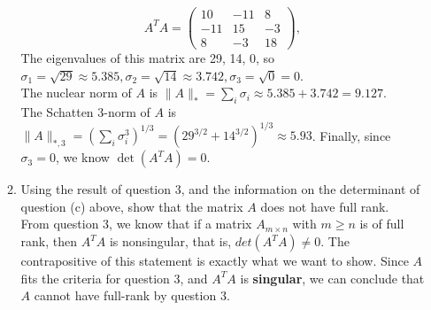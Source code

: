\documentclass[11pt]{article}
\newcommand{\n}{\vspace{0.2cm}}
\begin{document}
\begin{enumerate}
\begin{enumerate}[label=(\alph*)]
\[			            A^TA = \begin{pmatrix} 10 & -11 & 8 \\ -11 & 15 & -3 \\ 8 & -3 & 18 \end{pmatrix},
		            \]
		            The eigenvalues of this matrix are 29, 14, 0, so \(\sigma_1 = \sqrt{29} \approx 5.385, \sigma_2 = \sqrt{14} \approx 3.742, \sigma_3 = \sqrt{0} = 0\). \n\\
		            The nuclear norm of \(A\) is \(\lVert A \rVert_* = \sum_i \sigma_i \approx 5.385 + 3.742 = 9.127\). \n\\
		            The Schatten 3-norm of \(A\) is \(\lVert A \rVert_{*,3} = \left( \sum_i \sigma_i^3 \right)^{1/3} = \left( 29^{3/2} + 14^{3/2} \right)^{1/3} \approx 5.93\).  Finally, since \(\sigma_3 = 0\), we know \(\det(A^TA) = 0\).
		      \item Using the result of question 3, and the information on the determinant of question (c) above, show that the matrix \(A\) does not have full rank. \n\\
		            From question 3, we know that if a matrix \(A_{m \times n}\) with \(m \geq n\) is of full rank, then \(A^TA\) is nonsingular, that is, \(det(A^TA) \neq 0\).  The contrapositive of this statement is exactly what we want to show.  Since \(A\) fits the criteria for question 3, and \(A^TA\) is \textbf{singular}, we can conclude that \(A\) cannot have full-rank by question 3.
	      \end{enumerate}
\end{enumerate}
\end{document}
